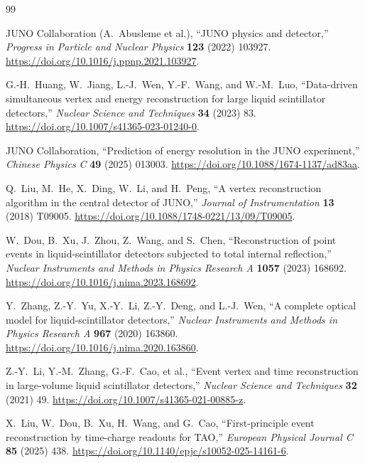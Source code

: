 \documentclass[UTF8,a4paper,11pt]{ctexart}
\begin{document}
{}
\begingroup
\small
\begin{thebibliography}{99}

JUNO Collaboration (A.~Abusleme et al.),
``JUNO physics and detector,''
\emph{Progress in Particle and Nuclear Physics} \textbf{123} (2022) 103927.
\url{https://doi.org/10.1016/j.ppnp.2021.103927}.

G.-H.~Huang, W.~Jiang, L.-J.~Wen, Y.-F.~Wang, and W.-M.~Luo,
``Data-driven simultaneous vertex and energy reconstruction for large liquid
scintillator detectors,''
\emph{Nuclear Science and Techniques} \textbf{34} (2023) 83.
\url{https://doi.org/10.1007/s41365-023-01240-0}.

JUNO Collaboration,
``Prediction of energy resolution in the JUNO experiment,''
\emph{Chinese Physics C} \textbf{49} (2025) 013003.
\url{https://doi.org/10.1088/1674-1137/ad83aa}.

Q.~Liu, M.~He, X.~Ding, W.~Li, and H.~Peng,
``A vertex reconstruction algorithm in the central detector of JUNO,''
\emph{Journal of Instrumentation} \textbf{13} (2018) T09005.
\url{https://doi.org/10.1088/1748-0221/13/09/T09005}.

W.~Dou, B.~Xu, J.~Zhou, Z.~Wang, and S.~Chen,
``Reconstruction of point events in liquid-scintillator detectors subjected
to total internal reflection,''
\emph{Nuclear Instruments and Methods in Physics Research A} \textbf{1057}
(2023) 168692.
\url{https://doi.org/10.1016/j.nima.2023.168692}.

Y.~Zhang, Z.-Y.~Yu, X.-Y.~Li, Z.-Y.~Deng, and L.-J.~Wen,
``A complete optical model for liquid-scintillator detectors,''
\emph{Nuclear Instruments and Methods in Physics Research A} \textbf{967}
(2020) 163860.
\url{https://doi.org/10.1016/j.nima.2020.163860}.

Z.-Y.~Li, Y.-M.~Zhang, G.-F.~Cao, et al.,
``Event vertex and time reconstruction in large-volume liquid scintillator
detectors,''
\emph{Nuclear Science and Techniques} \textbf{32} (2021) 49.
\url{https://doi.org/10.1007/s41365-021-00885-z}.

X.~Liu, W.~Dou, B.~Xu, H.~Wang, and G.~Cao,
``First-principle event reconstruction by time-charge readouts for TAO,''
\emph{European Physical Journal C} \textbf{85} (2025) 438.
\url{https://doi.org/10.1140/epjc/s10052-025-14161-6}.


\end{thebibliography}
\end{document}

